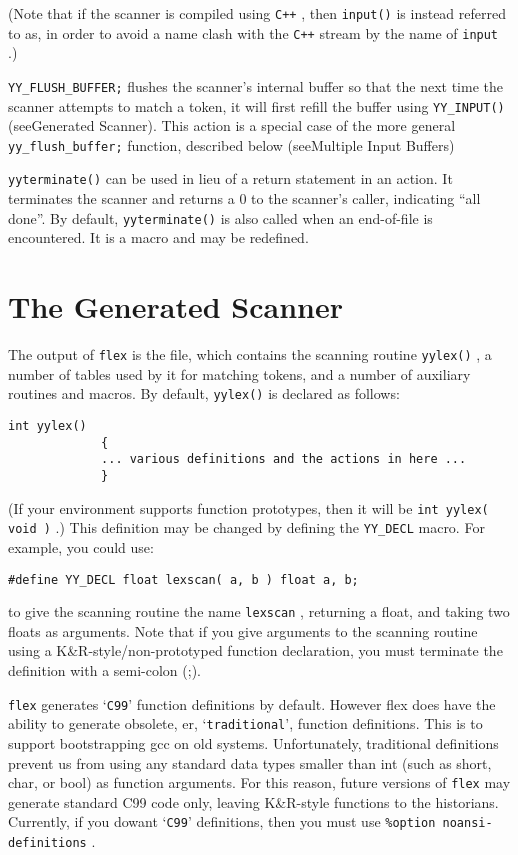 \documentclass[openany,oneside]{book}
\begin{document}
(Note that if the scanner is compiled using \verb`C++` , then \verb`input()` is instead referred to as, in order to
avoid a name clash with the \verb`C++` stream by the name of \verb`input` .)

 \verb`YY_FLUSH_BUFFER;` flushes the scanner's internal buffer so that
the next time the scanner attempts to match a token, it will first
refill the buffer using \verb`YY_INPUT()` (seeGenerated Scanner). 
This action is a special case of the more general \verb`yy_flush_buffer;` function, described below (seeMultiple Input Buffers)

 \verb`yyterminate()` can be used in lieu of a return statement in an
action.  It terminates the scanner and returns a 0 to the scanner's
caller, indicating “all done”.  By default, \verb`yyterminate()` is
also called when an end-of-file is encountered.  It is a macro and may
be redefined.
\chapter{The Generated Scanner}


The output of \verb`flex` is the file, which contains
the scanning routine \verb`yylex()` , a number of tables used by it for
matching tokens, and a number of auxiliary routines and macros.  By
default, \verb`yylex()` is declared as follows:
\begin{verbatim}
int yylex()
             {
             ... various definitions and the actions in here ...
             }
\end{verbatim}


(If your environment supports function prototypes, then it will be \verb`int yylex( void )` .)  This definition may be changed by defining
the \verb`YY_DECL` macro.  For example, you could use:


\begin{verbatim}
#define YY_DECL float lexscan( a, b ) float a, b;
\end{verbatim}


to give the scanning routine the name \verb`lexscan` , returning a float,
and taking two floats as arguments.  Note that if you give arguments to
the scanning routine using a K\&{}R-style/non-prototyped function
declaration, you must terminate the definition with a semi-colon (;).

 \verb`flex` generates ‘\verb`C99`’ function definitions by
default. However flex does have the ability to generate obsolete, er,
‘\verb`traditional`’, function definitions. This is to support
bootstrapping gcc on old systems.  Unfortunately, traditional
definitions prevent us from using any standard data types smaller than
int (such as short, char, or bool) as function arguments.  For this
reason, future versions of \verb`flex` may generate standard C99 code
only, leaving K\&{}R-style functions to the historians.  Currently, if you
dowant ‘\verb`C99`’ definitions, then you must use \verb`%option noansi-definitions` .
\end{document}
